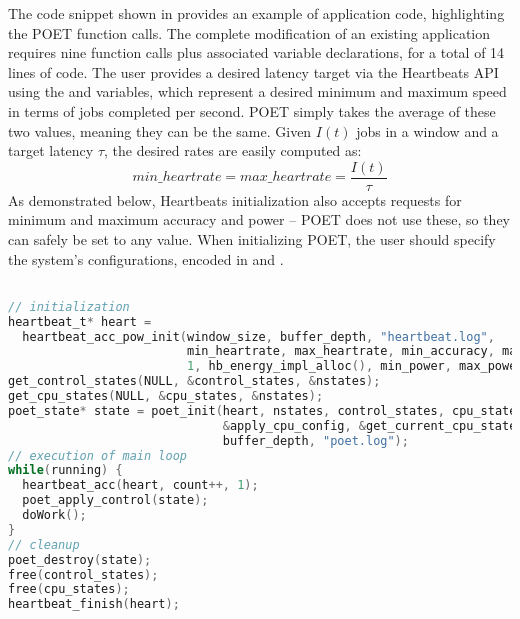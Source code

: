 The code snippet shown in  provides an example of application code, highlighting the POET function calls.
The complete modification of an existing application requires nine function calls plus associated variable declarations, for a total of 14 lines of code.
The user provides a desired latency target via the Heartbeats API using the  and  variables, which represent a desired minimum and maximum speed in terms of jobs completed per second.
POET simply takes the average of these two values, meaning they can be the same.
Given $I(t)$ jobs in a window and a target latency $\tau$, the desired rates are easily computed as:
\begin{equation}
  min\_heartrate = max\_heartrate = \frac{I(t)}{\tau} 
  \label{eqn:latency-to-performance}
\end{equation}
As demonstrated below, Heartbeats initialization also accepts requests for minimum and maximum accuracy and power -- POET does not use these, so they can safely be set to any value.
When initializing POET, the user should specify the system's configurations, encoded in  and .

%
\begin{lstlisting}[language=C,%
  caption={Example of POET application code.},%
  label={lst:poet-example}]%

// initialization
heartbeat_t* heart =
  heartbeat_acc_pow_init(window_size, buffer_depth, "heartbeat.log",
                         min_heartrate, max_heartrate, min_accuracy, max_accuracy,
                         1, hb_energy_impl_alloc(), min_power, max_power);
get_control_states(NULL, &control_states, &nstates);
get_cpu_states(NULL, &cpu_states, &nstates);
poet_state* state = poet_init(heart, nstates, control_states, cpu_states,
                              &apply_cpu_config, &get_current_cpu_state,
                              buffer_depth, "poet.log");
// execution of main loop
while(running) {
  heartbeat_acc(heart, count++, 1);
  poet_apply_control(state);
  doWork();
}
// cleanup
poet_destroy(state);
free(control_states);
free(cpu_states);
heartbeat_finish(heart);
\end{lstlisting}
